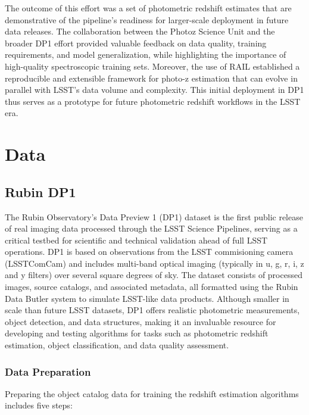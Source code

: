 The outcome of this effort was a set of photometric redshift estimates that are demonstrative of the pipeline's readiness for larger-scale deployment in future data releases.  The collaboration between the Photoz Science Unit and the broader DP1 effort provided valuable feedback on data quality, training requirements, and model generalization, while highlighting the importance of high-quality spectroscopic training sets. Moreover, the use of RAIL established a reproducible and extensible framework for photo-z estimation that can evolve in parallel with LSST’s data volume and complexity. This initial deployment in DP1 thus serves as a prototype for future photometric redshift workflows in the LSST era.

\section{Data}
\label{sec:data:0}

\subsection{Rubin DP1}
\label{sec:data:dp1}

The Rubin Observatory’s Data Preview 1 (DP1) dataset is the first public release of real imaging data processed through the LSST Science Pipelines, serving as a critical testbed for scientific and technical validation ahead of full LSST operations.  DP1 is based on observations from the LSST commisioning camera (LSSTComCam) and includes multi-band optical imaging (typically in u, g, r, i, z and y filters) over several square degrees of sky.  The dataset consists of processed images, source catalogs, and associated metadata, all formatted using the Rubin Data Butler system to simulate LSST-like data products. Although smaller in scale than future LSST datasets, DP1 offers realistic photometric measurements, object detection, and data structures, making it an invaluable resource for developing and testing algorithms for tasks such as photometric redshift estimation, object classification, and data quality assessment.

\subsubsection{Data Preparation}
\label{sec:data:dp1:preparation}

Preparing the object catalog data for training the redshift estimation algorithms includes five steps:

